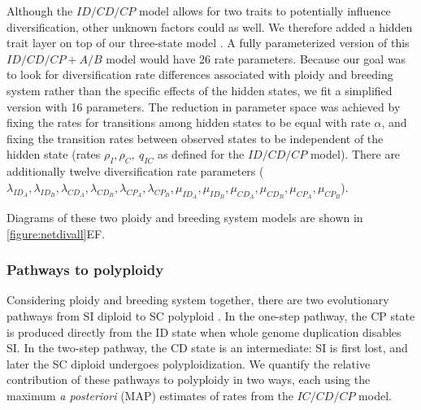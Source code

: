 Although the $ID/CD/CP$ model allows for two traits to potentially influence diversification, other unknown factors could as well.
We therefore added a hidden trait layer on top of our three-state model \citep[analogous to][]{caetano_2018, huang_2018}.
A fully parameterized version of this $ID/CD/CP+A/B$ model would have 26 rate parameters. 
Because our goal was to look for diversification rate differences associated with ploidy and breeding system rather than the specific effects of the hidden states, we fit a simplified version with 16 parameters.
The reduction in parameter space was achieved by fixing the rates for transitions among hidden states to be equal with rate $\alpha$, and fixing the transition rates between observed states to be independent of the hidden state (rates $\rho_I,\rho_C,\ q_{IC}$ as defined for the $ID/CD/CP$ model).
There are additionally twelve diversification rate parameters ($\lambda_{ID_A},  \lambda_{ID_B},  \lambda_{CD_A}, \lambda_{CD_B}, \lambda_{CP_A}, \lambda_{CP_B}, \mu_{ID_A}, \mu_{ID_B}, \mu_{CD_A}, \mu_{CD_B},  \mu_{CP_A}, \mu_{CP_B}$).

Diagrams of these two ploidy and breeding system models are shown in \cref{figure:netdivall}EF.  %

\subsubsection{Pathways to polyploidy}

Considering ploidy and breeding system together, there are two evolutionary pathways from SI diploid to SC polyploid \citep{brunet2001, robertson_2011}.
In the one-step pathway, the CP state is produced directly from the ID state when whole genome duplication disables SI.
In the two-step pathway, the CD state is an intermediate: SI is first lost, and later the SC diploid undergoes polyploidization.
We quantify the relative contribution of these pathways to polyploidy in two ways, each using the maximum \textit{a posteriori} (MAP) estimates of rates from the $IC/CD/CP$ model.

